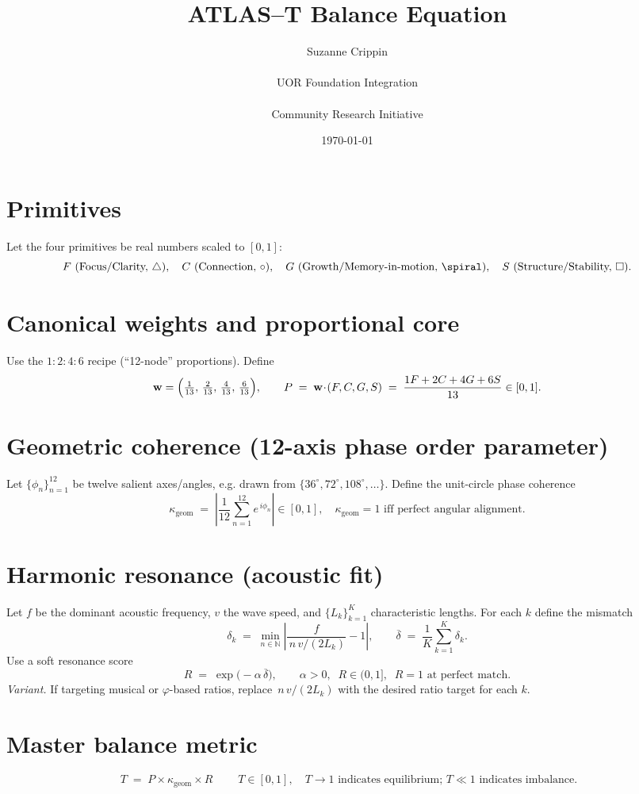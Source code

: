 \documentclass[11pt]{article}
\title{ATLAS--T Balance Equation}
\author{Suzanne Crippin \\ \\ UOR Foundation Integration \\ \\ Community Research Initiative}
\date{\today}
\begin{document}
\maketitle

\section*{Primitives}
Let the four primitives be real numbers scaled to $[0,1]$:
\[
F \text{ (Focus/Clarity, }\triangle),\quad
C \text{ (Connection, }\circ),\quad
G \text{ (Growth/Memory-in-motion, }\spiral),\quad
S \text{ (Structure/Stability, }\square).
\]

\section*{Canonical weights and proportional core}
Use the $1{:}2{:}4{:}6$ recipe (``12-node'' proportions). Define
\[
\mathbf w=\Bigl(\tfrac{1}{13},\,\tfrac{2}{13},\,\tfrac{4}{13},\,\tfrac{6}{13}\Bigr),
\qquad
P \;=\; \mathbf w\!\cdot\!(F,C,G,S)
\;=\; \frac{1F + 2C + 4G + 6S}{13}\in[0,1].
\]

\section*{Geometric coherence (12-axis phase order parameter)}
Let $\{\phi_n\}_{n=1}^{12}$ be twelve salient axes/angles, e.g. drawn from
$\{36^\circ,72^\circ,108^\circ,\ldots\}$. Define the unit-circle phase coherence
\[
\kappa_{\mathrm{geom}}
\;=\;
\left|\frac{1}{12}\sum_{n=1}^{12} e^{\,i\phi_n}\right|
\in[0,1],
\quad
\kappa_{\mathrm{geom}}=1 \text{ iff perfect angular alignment.}
\]

\section*{Harmonic resonance (acoustic fit)}
Let $f$ be the dominant acoustic frequency, $v$ the wave speed, and
$\{L_k\}_{k=1}^K$ characteristic lengths. For each $k$ define the mismatch
\[
\delta_k
\;=\;
\min_{n\in\mathbb N}
\left|\frac{f}{\,n\,v/(2L_k)}-1\right|,
\qquad
\overline{\delta} \;=\; \frac{1}{K}\sum_{k=1}^{K}\delta_k.
\]
Use a soft resonance score
\[
R \;=\; \exp\!\bigl(-\alpha\,\overline{\delta}\bigr),
\qquad
\alpha>0,\;\; R\in(0,1],\;\; R=1 \text{ at perfect match.}
\]
\emph{Variant.} If targeting musical or $\varphi$-based ratios, replace
$\,n\,v/(2L_k)$ with the desired ratio target for each $k$.

\section*{Master balance metric}
\[
\boxed{\; T \;=\; P \times \kappa_{\mathrm{geom}} \times R \;}
\qquad
T\in[0,1],\quad
T\to 1 \text{ indicates equilibrium; } T\ll 1 \text{ indicates imbalance.}
\]
\end{document}
